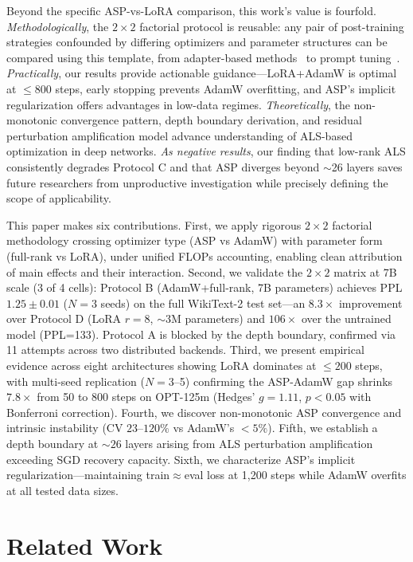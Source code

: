 \documentclass[11pt]{article}
\begin{document}
Beyond the specific ASP-vs-LoRA comparison, this work's value is fourfold. \textit{Methodologically}, the $2\times 2$ factorial protocol is reusable: any pair of post-training strategies confounded by differing optimizers and parameter structures can be compared using this template, from adapter-based methods~\cite{houlsby2019parameter} to prompt tuning~\cite{lester2021power}. \textit{Practically}, our results provide actionable guidance---LoRA+AdamW is optimal at $\leq 800$ steps, early stopping prevents AdamW overfitting, and ASP's implicit regularization offers advantages in low-data regimes. \textit{Theoretically}, the non-monotonic convergence pattern, depth boundary derivation, and residual perturbation amplification model advance understanding of ALS-based optimization in deep networks. \textit{As negative results}, our finding that low-rank ALS consistently degrades Protocol C and that ASP diverges beyond $\sim$26 layers saves future researchers from unproductive investigation while precisely defining the scope of applicability.

This paper makes six contributions. First, we apply rigorous $2\times2$ factorial methodology crossing optimizer type (ASP vs AdamW) with parameter form (full-rank vs LoRA), under unified FLOPs accounting, enabling clean attribution of main effects and their interaction. Second, we validate the $2\times2$ matrix at 7B scale (3 of 4 cells): Protocol B (AdamW+full-rank, 7B parameters) achieves PPL $1.25 \pm 0.01$ ($N=3$ seeds) on the full WikiText-2 test set---an $8.3\times$ improvement over Protocol D (LoRA $r=8$, $\sim$3M parameters) and $106\times$ over the untrained model (PPL=133). Protocol A is blocked by the depth boundary, confirmed via 11 attempts across two distributed backends. Third, we present empirical evidence across eight architectures showing LoRA dominates at $\leq 200$ steps, with multi-seed replication ($N=3$--5) confirming the ASP-AdamW gap shrinks $7.8\times$ from 50 to 800 steps on OPT-125m (Hedges' $g=1.11$, $p<0.05$ with Bonferroni correction). Fourth, we discover non-monotonic ASP convergence and intrinsic instability (CV $23$--$120\%$ vs AdamW's $<5\%$). Fifth, we establish a depth boundary at $\sim26$ layers arising from ALS perturbation amplification exceeding SGD recovery capacity. Sixth, we characterize ASP's implicit regularization---maintaining train$\approx$eval loss at 1,200 steps while AdamW overfits at all tested data sizes.

\section{Related Work}
\end{document}
